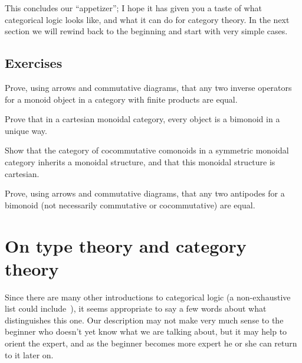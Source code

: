 \documentclass{book}
\begin{document}
This concludes our ``appetizer''; I hope it has given you a taste of what categorical logic looks like, and what it can do for category theory.
In the next section we will rewind back to the beginning and start with very simple cases.

\subsection*{Exercises}

\begin{ex}\label{ex:fp-inv-uniq}
  Prove, using arrows and commutative diagrams, that any two inverse operators for a monoid object in a category with finite products are equal.
\end{ex}

\begin{ex}\label{ex:cartmon-bimon-uniq}
  Prove that in a cartesian monoidal category, every object is a bimonoid in a unique way.
\end{ex}

\begin{ex}\label{ex:ccmon-cart}
  Show that the category of cocommutative comonoids in a symmetric monoidal category inherits a monoidal structure, and that this monoidal structure is cartesian.
\end{ex}

\begin{ex}\label{ex:antipode}
  Prove, using arrows and commutative diagrams, that any two antipodes for a bimonoid (not necessarily commutative or cocommutative) are equal.
\end{ex}


\section{On type theory and category theory}
\label{sec:generalities}

Since there are many other introductions to categorical logic (a non-exhaustive list could include~\cite{mr:focl,ls:hocl,jacobs:cltt,goldblatt:topoi,ptj:elephant}), it seems appropriate to say a few words about what distinguishes this one.
Our description may not make very much sense to the beginner who doesn't yet know what we are talking about, but it may help to orient the expert, and as the beginner becomes more expert he or she can return to it later on.
\end{document}
